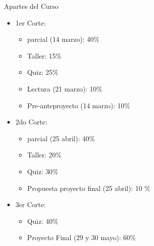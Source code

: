 \documentclass[ignorenonframetext,]{beamer}
\providecommand{\tightlist}{%
  \setlength{\itemsep}{0pt}\setlength{\parskip}{0pt}}
\begin{document}
\begin{frame}{Apartes del Curso}

\begin{itemize}
\tightlist
\item
  1er Corte:

  \begin{itemize}
  \tightlist
  \item
    parcial (14 marzo): 40\%
  \item
    Taller: 15\%
  \item
    Quiz: 25\%
\item
    Lectura (21 marzo): 10\%
\item
    Pre-anteproyecto (14 marzo): 10\%
  \end{itemize}
\item
  2do Corte:

  \begin{itemize}
  \tightlist
  \item
    parcial (25 abril): 40\%
  \item
    Taller: 20\%
  \item
    Quiz: 30\%
  \item
     Propuesta proyecto final (25 abril): 10 \%
  \end{itemize}
\item
  3er Corte:

  \begin{itemize}
  \tightlist
  \item
    Quiz: 40\%
  \item
    Proyecto Final (29 y 30 mayo): 60\%
  \end{itemize}
\end{itemize}

\end{frame}
\end{document}
